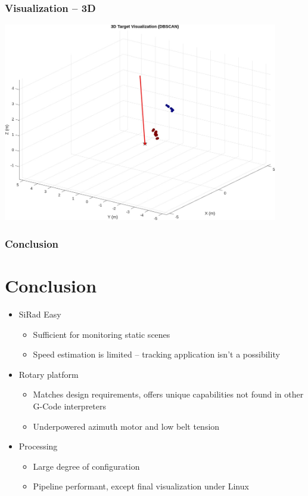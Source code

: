 \documentclass[aspectratio=43]{beamer}
\begin{document}
\begin{frame}[fragile]
  \frametitle{Visualization -- 3D}
  \begin{center}
    \includegraphics[width=0.9\textwidth]{../img/vis_3d.jpg}
  \end{center}
\end{frame}


\begin{frame}[fragile]
  \frametitle{Conclusion}
  \section{Conclusion}
  \begin{itemize}
    \item SiRad Easy
      \begin{itemize}
        \item Sufficient for monitoring static scenes
        \item Speed estimation is limited -- tracking application isn't a possibility
      \end{itemize}
    \item Rotary platform
      \begin{itemize}
        \item Matches design requirements, offers unique capabilities not found in other G-Code interpreters
        \item Underpowered azimuth motor and low belt tension
      \end{itemize}
		\item Processing
			\begin{itemize}
				\item Large degree of configuration
				\item Pipeline performant, except final visualization under Linux
			\end{itemize}
  \end{itemize}
\end{frame}
\end{document}
